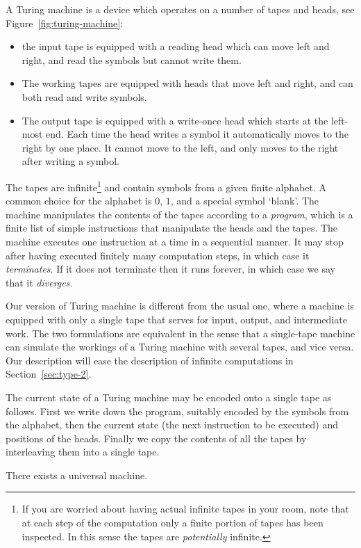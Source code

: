 A Turing machine is a device which operates on a number of tapes and
heads, see Figure~\ref{fig:turing-machine}:
%
\begin{itemize}
\item the input tape is equipped with a reading head which can move
  left and right, and read the symbols but cannot write them.
\item The working tapes are equipped with heads that move left and
  right, and can both read and write symbols.
\item The output tape is equipped with a write-once head which starts
  at the left-most end. Each time the head writes a symbol it
  automatically moves to the right by one place. It cannot move to the
  left, and only moves to the right after writing a symbol.
\end{itemize}
%
The tapes are infinite\footnote{If you are worried about having actual
  infinite tapes in your room, note that at each step of the
  computation only a finite portion of tapes has been inspected. In
  this sense the tapes are \emph{potentially} infinite.} and contain
symbols from a given finite alphabet. A common choice for the alphabet
is $0$, $1$, and a special symbol `blank'. The machine manipulates the
contents of the tapes according to a \emph{program}, which is a finite
list of simple instructions that manipulate the heads and the tapes.
The machine executes one instruction at a time in a sequential manner.
It may stop after having executed finitely many computation steps, in
which case it \emph{terminates}. If it does not terminate then it runs
forever, in which case we say that it \emph{diverges}.

Our version of Turing machine is different from the usual one, where a
machine is equipped with only a single tape that serves for input,
output, and intermediate work. The two formulations are equivalent in
the sense that a single-tape machine can simulate the workings of a
Turing machine with several tapes, and vice versa. Our description
will ease the description of infinite computations in
Section~\ref{sec:type-2}.

The current state of a Turing machine may be encoded onto a single
tape as follows. First we write down the program, suitably encoded by
the symbols from the alphabet, then the current state
(the next instruction to be executed) and positions of the heads.
Finally we copy the contents of all the tapes by interleaving them
into a single tape.

\begin{theorem}[Turing]
  There exists a universal machine.
\end{theorem}

